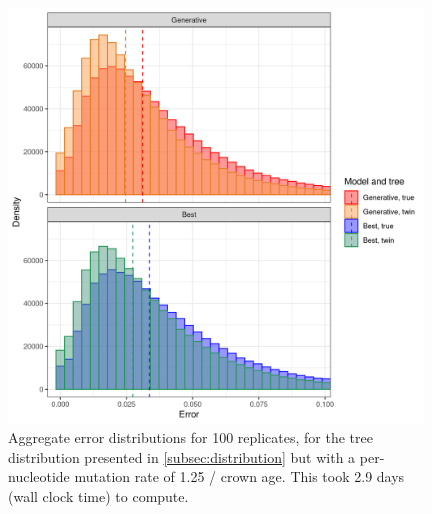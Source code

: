 \begin{figure}[H]
  \includegraphics[width=0.98\textwidth]{pirouette_example_38/errors.png}
  \caption{Aggregate error distributions for 100 replicates,
    for the tree distribution presented 
    in \ref{subsec:distribution} but with a per-nucleotide mutation rate 
    of 1.25 / crown age. 
    This took 2.9 days (wall clock time) to compute.}
  \label{fig:example_1.25_mutation_rate}
\end{figure}

